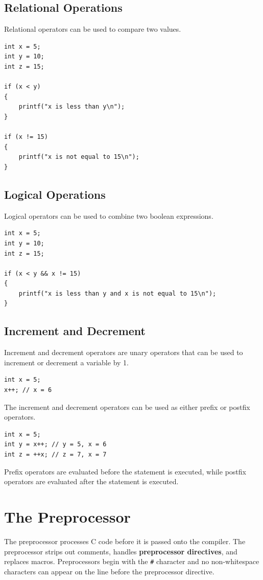 \documentclass{report}
\begin{document}
\section{Relational Operations}
Relational operators can be used to compare two values.
\begin{verbatim}
int x = 5;
int y = 10;
int z = 15;

if (x < y)
{
    printf("x is less than y\n");
}

if (x != 15)
{
    printf("x is not equal to 15\n");
}
\end{verbatim}
\section{Logical Operations}
Logical operators can be used to combine two boolean expressions.
\begin{verbatim}
int x = 5;
int y = 10;
int z = 15;

if (x < y && x != 15)
{
    printf("x is less than y and x is not equal to 15\n");
}
\end{verbatim}
\section{Increment and Decrement}
Increment and decrement operators are unary operators that can be used to increment or decrement a variable by 1.
\begin{verbatim}
int x = 5;
x++; // x = 6
\end{verbatim}
The increment and decrement operators can be used as either prefix or postfix operators.
\begin{verbatim}
int x = 5;
int y = x++; // y = 5, x = 6
int z = ++x; // z = 7, x = 7
\end{verbatim}
Prefix operators are evaluated before the statement is executed, while postfix operators are evaluated after the statement is executed.
\chapter{The Preprocessor}
The preprocessor processes C code before it is passed onto the compiler.
The preprocessor strips out comments, handles \textbf{preprocessor directives}, and replaces macros.
Preprocessors begin with the \texttt{#} character and no non-whitespace characters can
appear on the line before the preprocessor directive.
\end{document}
